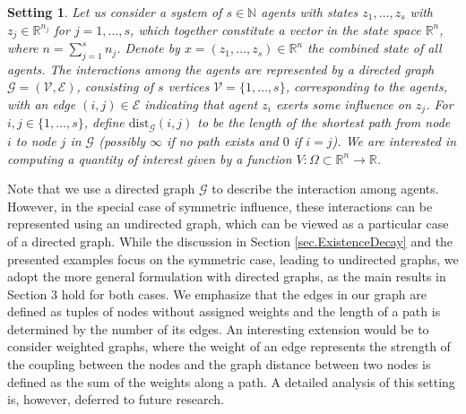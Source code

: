 \documentclass{article}
\newcommand{\agents}{\lbrace 1, \dots, s \rbrace}
\newtheorem{setting}{Setting}[section]
\begin{document}
\begin{setting} \label{setting:general}
  Let us consider a system of $s \in \mathbb{N}$ agents with states $z_1, \dots, z_s$ with $z_j \in \mathbb{R}^{n_j}$ for $j = 1, \dots, s$, which together constitute a vector in the state space $\mathbb{R}^n$, where $n = \sum_{j=1}^s n_j$. Denote by $x = (z_1, \dots, z_s) \in \mathbb{R}^n$ the combined state of all agents. The interactions among the agents are represented by a directed graph $\mathcal{G} = (\mathcal{V}, \mathcal{E})$, consisting of $s$ vertices $\mathcal{V} = \agents$, corresponding to the agents, with an edge $(i,j) \in \mathcal{E}$ indicating that agent $z_i$ exerts some influence on $z_j$. For $i, j \in \agents$, define $\text{dist}_{\mathcal{G}}(i,j)$ to be the length of the shortest path from node $i$ to node $j$ in $\mathcal{G}$ (possibly $\infty$ if no path exists and $0$ if $i = j$). We are interested in computing a quantity of interest given by a function $V \colon \Omega \subset \mathbb{R}^n \to \mathbb{R}$. 
\end{setting}
Note that we use a directed graph $\mathcal{G}$ to describe the interaction among agents. However, in the special case of symmetric influence, these interactions can be represented using an undirected graph, which can be viewed as a particular case of a directed graph. While the discussion in Section \ref{sec.ExistenceDecay} and the presented examples focus on the symmetric case, leading to undirected graphs, we adopt the more general formulation with directed graphs, as the main results in Section 3 hold for both cases. We emphasize that the edges in our graph are defined as tuples of nodes without assigned weights and the length of a path is determined by the number of its edges. An interesting extension would be to consider weighted graphs, where the weight of an edge represents the strength of the coupling between the nodes and the graph distance between two nodes is defined as the sum of the weights along a path. A detailed analysis of this setting is, however, deferred to future research.
\end{document}
